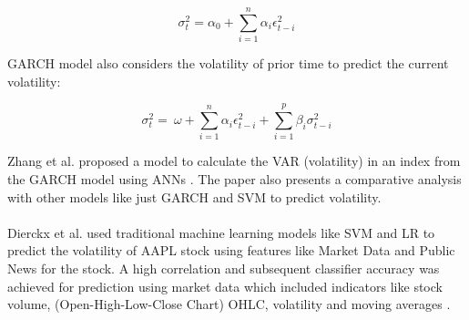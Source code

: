 \documentclass[a4paper, 12pt]{article}
\begin{document}
\begin{equation}
    \sigma_t^2 = \alpha_0 + \sum_{i = 1}^{n} \alpha_i \epsilon_{t - i}^2
\end{equation}

\noindent GARCH model also considers the volatility of prior time to predict the current volatility:

\begin{equation}
    \sigma_t^2 = \ \omega + \sum_{i = 1}^{n} \alpha_i \epsilon_{t - i}^2 + \sum_{i = 1}^{p} \beta_i \sigma_{t - i}^2
\end{equation}

\noindent Zhang et al. proposed a model to calculate the VAR (volatility) in an index from the GARCH model using ANNs \cite{zhang2017calculating}. The paper also presents a comparative analysis with other models like just GARCH and SVM to predict volatility.
\\
\\
\noindent Dierckx et al. used traditional machine learning models like SVM and LR to predict the volatility of AAPL stock using features like Market Data and Public News for the stock. A high correlation and subsequent classifier accuracy was achieved for prediction using market data which included indicators like stock volume, (Open-High-Low-Close Chart) OHLC, volatility and moving averages \cite{dierckx2020using}.

\vskip 0.2in
\end{document}
